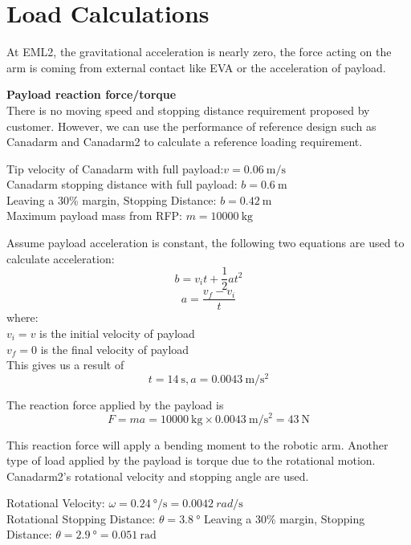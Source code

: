 \section{Load Calculations}
\label{app:loadcalc}
\setcounter{equation}{0}
At \gls{EML2}, the gravitational acceleration is nearly zero, the force acting on the arm is coming from external contact like \gls{EVA} or the acceleration of payload.

\large \textbf{Payload reaction force/torque}\\
\normalsize There is no moving speed and stopping distance requirement proposed by customer. However, we can use the performance of reference design such as Canadarm and Canadarm2 to calculate a reference loading requirement. 

Tip velocity of Canadarm with full payload:$v=\SI{0.06}{\metre/\second}$\\
Canadarm stopping distance with full payload: $b=\SI{0.6}{\metre}$\\
Leaving a 30\% margin, Stopping Distance: $b=\SI{0.42}{\metre}$\\
Maximum payload mass from \gls{RFP}: $m=\SI{10000}{\kilo\gram}$

Assume payload acceleration is constant, the following two equations are used to calculate acceleration:
\begin{equation}
b=v_it+\frac{1}{2}at^2
\end{equation}
\begin{equation}
a=\frac{v_f-v_i}{t}
\end{equation}
where:\\
$v_i=v$ is the initial velocity of payload\\
$v_f=0$ is the final velocity of payload\\
This gives us a result of $$t=\SI{14}{\second}, a=\SI{0.0043}{\metre/\square\second}$$

The reaction force applied by the payload is 
$$F=ma=\SI{10000}{\kilo\gram}\times\SI{0.0043}{\metre/\square\second}=\SI{43}{\newton}$$

This reaction force will apply a bending moment to the robotic arm. Another type of load applied by the payload is torque due to the rotational motion. Canadarm2's rotational velocity and stopping angle are used. 

Rotational Velocity: $\omega=\SI{0.24}{\degree/\second}=\SI{0.0042}{rad/\second}$ \cite{NASAsysreq_Kumar}\\
Rotational Stopping Distance: $\theta=\SI{3.8}{\degree}$
Leaving a 30\% margin, Stopping Distance: $\theta=\SI{2.9}{\degree}=\SI{0.051}{\radian}$

